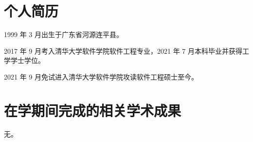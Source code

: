 
\begin{resume}

  \section*{个人简历}
  1999 年 3 月出生于广东省河源连平县。

  2017 年 9 月考入清华大学软件学院软件工程专业，2021 年 7 月本科毕业并获得工学学士学位。

  2021 年 9 月免试进入清华大学软件学院攻读软件工程硕士至今。

  \section*{在学期间完成的相关学术成果}

  无。

\end{resume}
